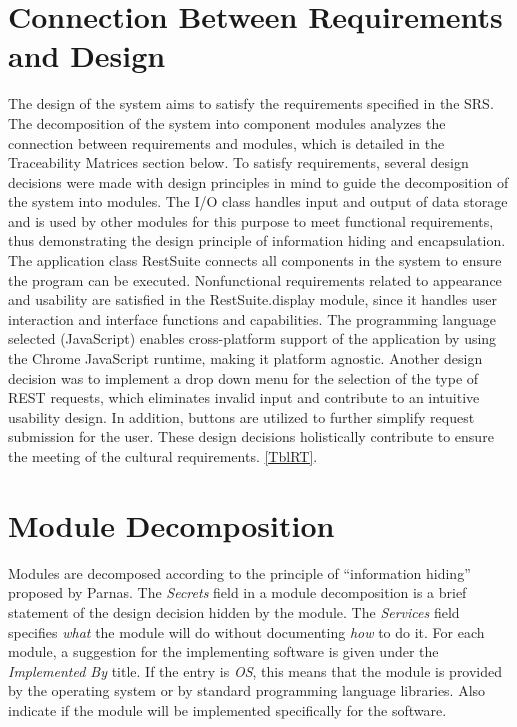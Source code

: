 \documentclass[12pt, titlepage]{article}
\begin{document}
\section{Connection Between Requirements and Design} \label{SecConnection}
The design of the system aims to satisfy the requirements specified in the SRS. The decomposition of the system into component modules analyzes the connection between requirements and modules, which is detailed in the Traceability Matrices section below. To satisfy requirements, several design decisions were made with design principles in mind to guide the decomposition of the system into modules. The I/O class handles input and output of data storage and is used by other modules for this purpose to meet functional requirements, thus demonstrating the design principle of information hiding and encapsulation. The application class RestSuite connects all components in the system to ensure the program can be executed. Nonfunctional requirements related to appearance and usability are satisfied in the RestSuite.display module, since it handles user interaction and interface functions and capabilities. The programming language selected (JavaScript) enables cross-platform support of the application by using the Chrome JavaScript runtime, making it platform agnostic. Another design decision was to implement a drop down menu for the selection of the type of REST requests, which eliminates invalid input and contribute to an intuitive usability design. In addition, buttons are utilized to further simplify request submission for the user. These design decisions holistically contribute to ensure the meeting of the cultural requirements.
\ref{TblRT}.


\section{Module Decomposition} \label{SecMD}

Modules are decomposed according to the principle of ``information hiding''
proposed by Parnas. The \emph{Secrets} field in a module
decomposition is a brief statement of the design decision hidden by the
module. The \emph{Services} field specifies \emph{what} the module will do
without documenting \emph{how} to do it. For each module, a suggestion for the
implementing software is given under the \emph{Implemented By} title. If the
entry is \emph{OS}, this means that the module is provided by the operating
system or by standard programming language libraries.  Also indicate if the
module will be implemented specifically for the software.
\end{document}
